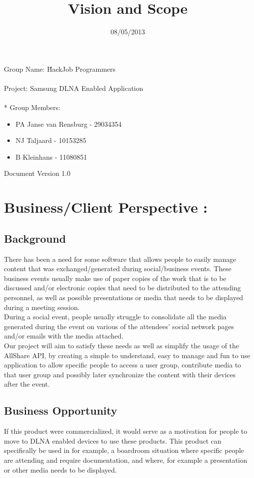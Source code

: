 \documentclass[12pt]{article}
\title{Vision and Scope}
\date{08/05/2013}
\begin{document}
  \maketitle
\begin{tabbing}
Group Name: \= HackJob Programmers
\\~
\\Project: Samsung DLNA Enabled Application
\\~
  \\* Group Members:
\end{tabbing}
	
	\begin{itemize}
	\item PA Janse van Rensburg - 29034354
	\item NJ Taljaard - 10153285
	\item B Kleinhans - 11080851
	\end{itemize}

Document Version 1.0

\newpage
\section{Business/Client Perspective :}
\subsection{Background}
There has been a need for some software that allows people to easily manage content that was exchanged/generated during social/business events. These business events usually make use of paper copies of the work that is to be discussed and/or electronic copies that need to be distributed to the attending personnel, as well as possible presentations or media that needs to be displayed during a meeting session.
\\During a social event, people usually struggle to consolidate all the media generated during the event on various of the attendees' social network pages and/or emails with the media attached.
\\ Our project will aim to satisfy these needs as well as simplify the usage of the AllShare API, by creating a simple to understand, easy to manage and fun to use application to allow specific people to access a user group, contribute media to that user group and possibly later synchronize the content with their devices after the event.

\subsection{Business Opportunity}
If this product were commercialized, it would serve as a motivation for people to move to DLNA enabled devices to use these products. This product can specifically be used in for example, a boardroom situation where specific people are attending and require documentation, and where, for example a presentation or other media needs to be displayed.
\end{document}
